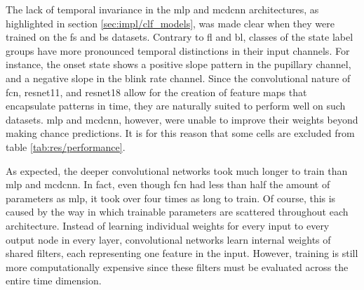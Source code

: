 
The lack of temporal invariance in the \acrshort{mlp} and \acrshort{mcdcnn} architectures, as highlighted in section \ref{sec:impl/clf_models}, was made clear when they were trained on the \acrshort{fs} and \acrshort{bs} datasets. Contrary to \acrshort{fl} and \acrshort{bl}, classes of the state label groups have more pronounced temporal distinctions in their input channels. For instance, the onset state shows a positive slope pattern in the pupillary channel, and a negative slope in the blink rate channel. Since the convolutional nature of \acrshort{fcn}, \acrshort{resnet11}, and \acrshort{resnet18} allow for the creation of feature maps that encapsulate patterns in time, they are naturally suited to perform well on such datasets. \acrshort{mlp} and \acrshort{mcdcnn}, however, were unable to improve their weights beyond making chance predictions. It is for this reason that some cells are excluded from table \ref{tab:res/performance}.

As expected, the deeper convolutional networks took much longer to train than \acrshort{mlp} and \acrshort{mcdcnn}. In fact, even though \acrshort{fcn} had less than half the amount of parameters as \acrshort{mlp}, it took over four times as long to train. Of course, this is caused by the way in which trainable parameters are scattered throughout each architecture. Instead of learning individual weights for every input to every output node in every layer, convolutional networks learn internal weights of shared filters, each representing one feature in the input. However, training is still more computationally expensive since these filters must be evaluated across the entire time dimension.

